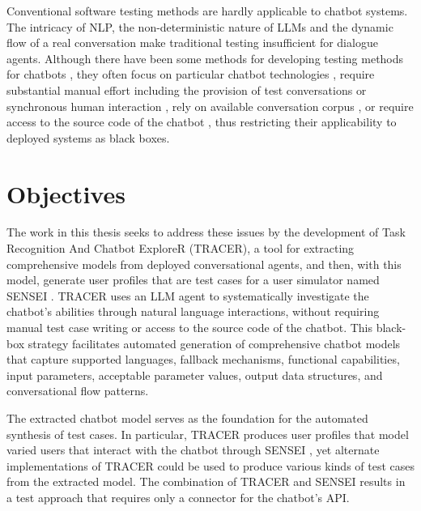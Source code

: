 Conventional software testing methods are hardly applicable to chatbot systems.
The intricacy of \ac{NLP}, the non-deterministic nature of \acp{LLM} and the dynamic flow of a real conversation make traditional testing insufficient for dialogue agents.
Although there have been some methods for developing testing methods for chatbots \cite{cuadradoIntegratingStaticQuality2024, canizaresMeasuringClusteringHeterogeneous2024}, they often focus on particular chatbot technologies \autocite{RasaTest2025}, require substantial manual effort including the provision of test conversations \autocite{CyaraBotium, RasaTest2025} or synchronous human interaction \autocite{renEvaluationTechniquesChatbot2019}, rely on available conversation corpus \autocite{vasconcelosBottesterTestingConversational2017}, or require access to the source code of the chatbot \autocite{canizaresCoveragebasedStrategiesAutomated2024, gomez-abajoMutationTestingTaskOriented2024, urricoMutaBotMutationTesting2024}, thus restricting their applicability to deployed systems as black boxes.

\section{Objectives}

The work in this thesis seeks to address these issues by the development of Task Recognition And Chatbot ExploreR (\ac{TRACER}), a tool for extracting comprehensive models from deployed conversational agents, and then, with this model, generate user profiles that are test cases for a user simulator named SENSEI \autocite{delaraAutomatedEndtoEndTesting2025, delaraSensei}.
\ac{TRACER} uses an \ac{LLM} agent to systematically investigate the chatbot's abilities through natural language interactions, without requiring manual test case writing or access to the source code of the chatbot.
This black-box strategy facilitates automated generation of comprehensive chatbot models that capture supported languages, fallback mechanisms, functional capabilities, input parameters, acceptable parameter values, output data structures, and conversational flow patterns.


The extracted chatbot model serves as the foundation for the automated synthesis of test cases.
In particular, \ac{TRACER} produces user profiles that model varied users that interact with the chatbot through SENSEI \autocite{delaraAutomatedEndtoEndTesting2025, delaraSensei}, yet alternate implementations of \ac{TRACER} could be used to produce various kinds of test cases from the extracted model.
The combination of \ac{TRACER} and SENSEI results in a test approach that requires only a connector for the chatbot’s API.

